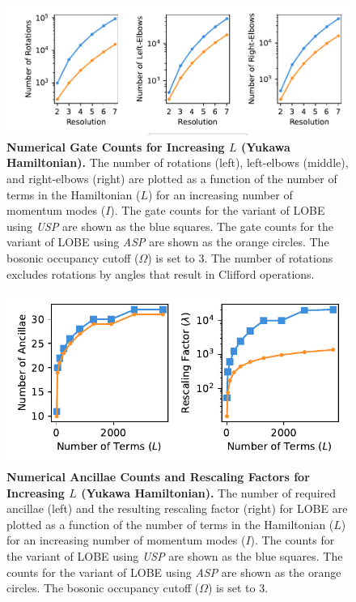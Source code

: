 \begin{figure}
    \centering
    \includegraphics[width=16cm]{figures/Yukawa_hamiltonian_gates_vs_terms.pdf}
    \caption{
        \textbf{Numerical Gate Counts for Increasing $L$ (Yukawa Hamiltonian).}
        The number of rotations (left), left-elbows (middle), and right-elbows (right) are plotted as a function of the number of terms in the Hamiltonian ($L$) for an increasing number of momentum modes ($I$).
        The gate counts for the variant of LOBE using \textit{USP} are shown as the blue squares.
        The gate counts for the variant of LOBE using \textit{ASP} are shown as the orange circles.
        The bosonic occupancy cutoff ($\Omega$) is set to $3$.
        The number of rotations excludes rotations by angles that result in Clifford operations.
    }
    \label{fig:Yukawa_hamiltonian_gates_vs_terms}
\end{figure}
\begin{figure}
    \centering
    \includegraphics[width=12cm]{figures/Yukawa_hamiltonian_qubits_and_rescaling_vs_terms.pdf}
    \caption{
        \textbf{Numerical Ancillae Counts and Rescaling Factors for Increasing $L$ (Yukawa Hamiltonian).}
        The number of required ancillae (left) and the resulting rescaling factor (right) for LOBE are plotted as a function of the number of terms in the Hamiltonian ($L$) for an increasing number of momentum modes ($I$).
        The counts for the variant of LOBE using \textit{USP} are shown as the blue squares.
        The counts for the variant of LOBE using \textit{ASP} are shown as the orange circles.
        The bosonic occupancy cutoff ($\Omega$) is set to $3$.
    }
    \label{fig:Yukawa_hamiltonian_qubits_and_rescaling_vs_terms}
\end{figure}

